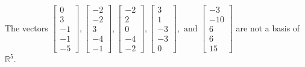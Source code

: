 \begin{exercise}
\begin{exerciseStatement}
  \end{exerciseStatement}
  \begin{exerciseAnswer}
   The vectors \(\left[\begin{array}{r}
0 \\
3 \\
-1 \\
-1 \\
-5
\end{array}\right] , \left[\begin{array}{r}
-2 \\
-2 \\
3 \\
-4 \\
-1
\end{array}\right] , \left[\begin{array}{r}
-2 \\
2 \\
0 \\
-4 \\
-2
\end{array}\right] , \left[\begin{array}{r}
3 \\
1 \\
-3 \\
-3 \\
0
\end{array}\right] , \text{ and } \left[\begin{array}{r}
-3 \\
-10 \\
6 \\
6 \\
15
\end{array}\right]\) 
  	 are not  a basis of \(\mathbb{R}^5\).
  


  \end{exerciseAnswer}
\end{exercise}